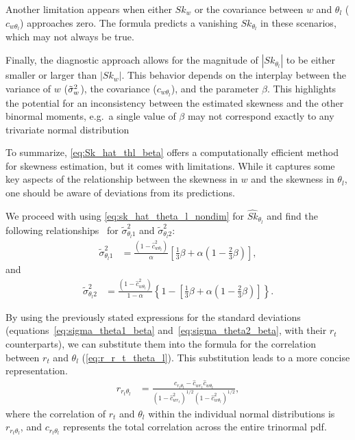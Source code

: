 Another limitation appears when either $Sk_w$
or the covariance between $w$ and $\theta_l$ ($c_{w \theta_l}$) approaches zero.
The formula predicts a vanishing $Sk_{\theta_l}$ in these scenarios,
which may not always be true.

Finally, the diagnostic approach allows for the magnitude of $\left| Sk_{\theta_l} \right|$
to be either smaller or larger than $\left| Sk_w \right|$.
This behavior depends on the interplay between the variance of $w$ (${\tilde{\sigma}_w}^2$),
the covariance ($c_{w \theta_l}$),
and the parameter $\beta$.
This highlights the potential for an inconsistency between the estimated skewness and the other binormal moments,
e.g.\ a single value of $\beta$ may not correspond exactly to any trivariate normal distribution

To summarize, \cref{eq:Sk_hat_thl_beta} offers a computationally efficient method for skewness estimation,
but it comes with limitations.
While it captures some key aspects of the relationship between the skewness in $w$
and the skewness in $\theta_l$,
one should be aware of deviations from its predictions.

We proceed with using \cref{eq:sk_hat_theta_l_nondim} for $\widehat{Sk}_{\theta_l}$
and find the following relationships~\cite{larson2005using}
for $\tilde{\sigma}_{\theta_l 1}^2$ and $\tilde{\sigma}_{\theta_l 2}^2$:
\begin{align}
    \label{eq:sigma_theta1_beta}
    \tilde{\sigma}_{\theta_l 1}^2
    &= \frac{\left(1 - \widehat{c}_{w \theta_l}^2\right)}{\alpha} \left[\frac{1}{3} \beta + \alpha \left(1 - \frac{2}{3} \beta\right)\right],
\end{align}
and
\begin{align}
    \label{eq:sigma_theta2_beta}
    \tilde{\sigma}_{\theta_l 2}^2
    &= \frac{\left(1 - \widehat{c}_{w \theta_l}^2\right)} {1 - \alpha} \left\{1 - \left[\frac{1}{3}\beta + \alpha \left(1 - \frac{2}{3} \beta \right)\right]\right\}.
\end{align}

By using the previously stated expressions for the standard deviations
(equations~\eqref{eq:sigma_theta1_beta} and~\eqref{eq:sigma_theta2_beta},
with their $r_t$ counterparts),
we can substitute them into the formula for the correlation between
$r_t$ and $\theta_l$ (\cref{eq:r_r_t_theta_l}).
This substitution leads to a more concise representation.
\begin{align}
    \label{eq:r_r_t_theta_l_beta}
    r_{r_t \theta_l}
    &= \frac{c_{r_t \theta_l} - \widehat{c}_{w r_t} \widehat{c}_{w \theta_l}}
    {\left(1 - \widehat{c}_{w r_t}^2\right)^{1/2} \left(1 - \widehat{c}_{w \theta_l}^2\right)^{1/2}},
\end{align}
where the correlation of $r_t$ and $\theta_l$ within the individual normal distributions is $r_{r_t \theta_l}$,
and $c_{r_t \theta_l}$ represents the total correlation across the entire trinormal \gls{pdf}.
